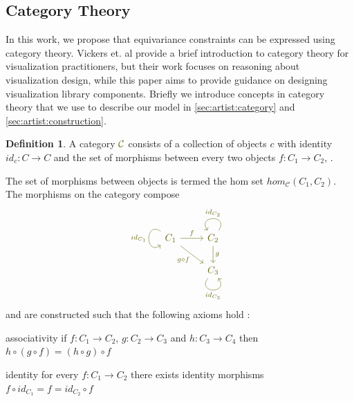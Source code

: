 \documentclass[10pt,journal,compsoc]{IEEEtran}
\theoremstyle{definition}
\newtheorem{definition}{Definition}[section]
\theoremstyle{remark}
\begin{document}
\subsection{Category Theory}
\label{sec:related-work:equivariance:category}
In this work, we propose that equivariance constraints can be expressed using category theory. Vickers et. al \cite{vickersUnderstandingVisualizationFormal2013} provide a brief introduction to category theory for visualization practitioners, but their work focuses on reasoning about visualization design, while this paper aims to provide guidance on designing visualization library components. Briefly we introduce concepts in category theory that we use to describe our model in \autoref{sec:artist:category} and \autoref{sec:artist:construction}. 

\begin{definition} A \textcolor{source}{category} $\textcolor{source}{\mathcal{C}}$ consists of a collection of objects $c$ with identity $id_c: C\rightarrow C$ and the set of morphisms between every two objects $f:C_1 \rightarrow C_2$, \cite{fongInvitationAppliedCategory2019,maclaneCategoriesWorkingMathematician2013}. 
\end{definition}
The set of morphisms between objects is termed the hom set $hom_{\mathcal{C}}(C_1, C_2)$. The morphisms on the category  compose
\begin{equation*}
  \begin{tikzcd}
    \textcolor{source}{C_1} \arrow[r, "f", color=source] \arrow[rd, "g\circ f"', color=source] \arrow["id_{C_1}"', loop, distance=2em, in=215, out=145, color=source] & \textcolor{source}{C_2} \arrow[d, "g", color=source] \arrow["id_{C_2}"', loop, distance=2em, in=125, out=55, color=source] \\
  & \textcolor{source}{C_3} \arrow["id_{C_3}"', loop, distance=2em, in=305, out=235, color=source]              
  \end{tikzcd}
\end{equation*}
 and are constructed such that the following axioms hold \cite{riehlCategoryTheoryContext}:
 \begin{LaTeXdescription}
   \item[associativity] if $f: C_1 \rightarrow C_2$, $g: C_2 \rightarrow C_3$ and $h: C_3 \rightarrow C_4$ then $h\circ (g \circ f) = (h \circ g) \circ f$
   \item[identity] for every $f: C_1 \rightarrow C_2$ there exists identity morphisms $f \circ id_{C_1} = f = id_{C_2} \circ f$
 \end{LaTeXdescription}
\end{document}
